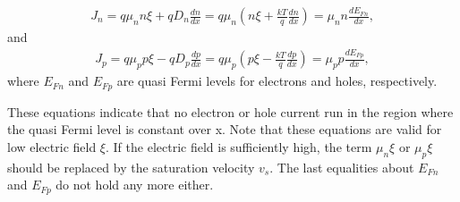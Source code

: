 \documentclass[letterpaper,10pt,english]{sphinxmanual}
\numberwithin{equation}{section}
\begin{document}
\begin{equation}\label{equation:Basic_equation:electron_current_quasi_fermi}
\begin{split}J_n = q\mu_nn\xi + qD_n\frac{dn}{dx} = q\mu_n\left(n\xi + \frac{kT}{q}\frac{dn}{dx}\right) = \mu_nn\frac{dE_{Fn}}{dx},\end{split}
\end{equation}
\sphinxAtStartPar
and
\begin{equation}\label{equation:Basic_equation:hole_current_quasi_fermi}
\begin{split}J_p = q\mu_pp\xi - qD_p\frac{dp}{dx} = q\mu_p\left(p\xi - \frac{kT}{q}\frac{dp}{dx}\right) = \mu_pp\frac{dE_{Fp}}{dx},\end{split}
\end{equation}
\sphinxAtStartPar
where \(E_{Fn}\) and \(E_{Fp}\) are quasi Fermi levels for electrons and holes, respectively.

\sphinxAtStartPar
These equations indicate that no electron or hole current run in the region where the quasi Fermi level is constant over x.
Note that these equations are valid for low electric field \(\xi\).
If the electric field is sufficiently high, the term \(\mu_n\xi\) or \(\mu_p\xi\) should be replaced by the saturation velocity \(v_s\).
The last equalities about \(E_{Fn}\) and \(E_{Fp}\) do not hold any more either.
\end{document}
